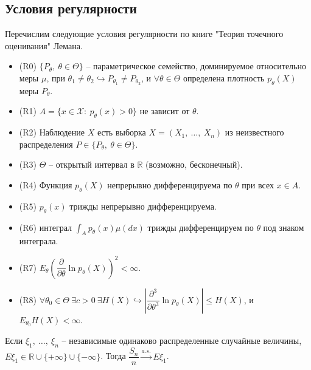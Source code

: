 \subsection{Условия регулярности}

Перечислим следующие условия регулярности по книге "Теория точечного оценивания" Лемана.
\begin{itemize}
    \item (R0) $\displaystyle \{P_{\theta } ,\ \theta \in \Theta \}$ -- параметрическое семейство, доминируемое относительно меры $\displaystyle \mu $, при $\displaystyle \theta _{1} \neq \theta _{2} \hookrightarrow P_{\theta _{1}} \neq P_{\theta _{2}}$, и $\displaystyle \forall \theta \in \Theta $ определена плотность $\displaystyle p_{\theta }( X)$ меры $\displaystyle P_{\theta }$.
    \item (R1) $\displaystyle A=\{x\in \mathcal{X} :\ p_{\theta }( x)  >0\}$ не зависит от $\displaystyle \theta $.
    \item (R2) Наблюдение $\displaystyle X$ есть выборка $\displaystyle X=( X_{1} ,\ \dotsc ,\ X_{n})$ из неизвестного распределения $\displaystyle P\in \{P_{\theta } ,\ \theta \in \Theta \}$.
    \item (R3) $\displaystyle \Theta $ -- открытый интервал в $\displaystyle \mathbb{R}$ (возможно, бесконечный).
    \item (R4) Функция $\displaystyle p_{\theta }( X)$ непрерывно дифференцируема по $\displaystyle \theta $ при всех $\displaystyle x\in A$.
    \item (R5) $\displaystyle p_{\theta }( x)$ трижды непрерывно дифференцируема.
    \item (R6) интеграл $\displaystyle \int _{A} p_{\theta }( x) \mu ( dx)$ трижды дифференцируем по $\displaystyle \theta $ под знаком интеграла.
    \item (R7) $\displaystyle E_{\theta }\left(\dfrac{\partial }{\partial \theta }\ln p_{\theta }( X)\right)^{2} < \infty $.
    \item (R8) $\displaystyle \forall \theta _{0} \in \Theta \ \exists c >0\ \exists H( X) \hookrightarrow \left| \dfrac{\partial ^{3}}{\partial \theta ^{3}}\ln p_{\theta }( X)\right| \leqslant H( X)$, и $\displaystyle E_{\theta _{0}} H( X) < \infty $.
\end{itemize}
\begin{lemma}
    Если $\displaystyle \xi _{1} ,\ \dotsc ,\ \xi _{n}$ -- независимые одинаково распределенные случайные величины, $\displaystyle E\xi _{1} \in \mathbb{R} \cup \{+\infty \} \cup \{-\infty \}$. Тогда $\displaystyle \dfrac{S_{n}}{n}\xrightarrow{a.s.} E\xi _{1}$.
\end{lemma}
